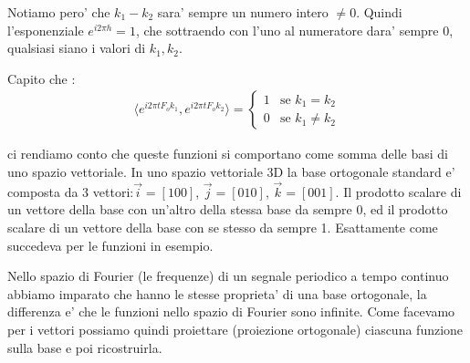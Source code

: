 Notiamo pero' che $k_1 - k_2$ sara' sempre un numero intero $\neq 0$. Quindi l'esponenziale $e^{i2\pi h} = 1$, che sottraendo con l'uno al numeratore dara' sempre 0, qualsiasi siano i valori di $k_1, k_2$.

Capito che :
\[\begin{split}
    \langle e^{i2\pi t F_o k_1}, e^{i2\pi t F_o k_2}\rangle = 
    \begin{cases}
    1 & \text{se } k_1 = k_2 \\
    0   & \text{se } k_1 \neq k_2 
  \end{cases}
\end{split}\]

ci rendiamo conto che queste funzioni si comportano come somma delle basi di uno spazio vettoriale.
In uno spazio vettoriale 3D la base ortogonale standard e' composta da 3 vettori:$\Vec{i} = [100]$, $\Vec{j} = [010]$, $\Vec{k} = [001]$. Il prodotto scalare di un vettore della base con un'altro della stessa base da sempre 0, ed il prodotto scalare di un vettore della base con se stesso da sempre 1. Esattamente come succedeva per le funzioni in esempio.

Nello spazio di Fourier (le frequenze) di un segnale periodico a tempo continuo abbiamo imparato che hanno le stesse proprieta' di una base ortogonale, la differenza e' che le funzioni nello spazio di Fourier sono infinite. Come facevamo per i vettori possiamo quindi proiettare (proiezione ortogonale) ciascuna funzione sulla base e poi ricostruirla.